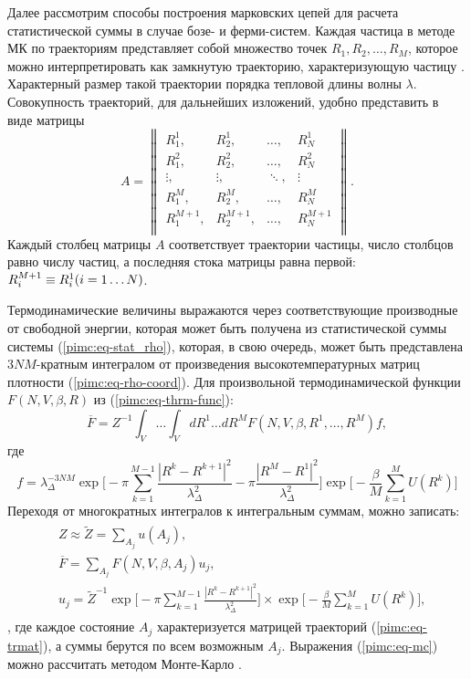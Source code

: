 Далее рассмотрим способы построения марковских цепей для расчета статистической суммы в случае бозе- и ферми-систем.
Каждая частица в методе МК по траекториям представляет собой множество точек ${R_1,R_2,\dots,R_M}$, которое можно интерпретировать как замкнутую траекторию, характеризующую частицу \cite{feiman2013}.
Характерный размер такой траектории порядка тепловой длины волны $\lambda$. Совокупность траекторий, для дальнейших изложений, удобно представить в виде матрицы
\begin{equation}
	\label{pimc:eq-trmat}
	A=
	\begin{Vmatrix}
		R_1^1, &R_2^1, &\dots, &R_N^1\\
		R_1^2, &R_2^2, &\dots, &R_N^2\\
		\vdots, &\vdots, &\ddots, &\vdots \\
		R_1^M, &R_2^M, &\dots, &R_N^M\\
		R_1^{M+1}, &R_2^{M+1}, &\dots, &R_N^{M+1}\\
	\end{Vmatrix}.
\end{equation} 
Каждый столбец матрицы $A$ соответствует траектории частицы, число столбцов равно числу частиц, а последняя стока матрицы равна первой: $R_i^{M+1} \equiv R_i^1 \space (i=1\dots N)$.

Термодинамические величины выражаются через соответствующие производные от свободной энергии, которая может быть получена из статистической суммы системы (\ref{pimc:eq-stat_rho}), которая, в свою очередь, может быть представлена $3NM$-кратным интегралом от произведения высокотемпературных матриц плотности (\ref{pimc:eq-rho-coord}).  Для произвольной термодинамической функции $F(N, V, \beta, R)$ из (\ref{pimc:eq-thrm-func}):
\begin{equation}
	\label{pimc:eq-mean-term}
	\overline{F}=Z^{-1}\int_V\dots \int_V dR^1 \dots dR^M F(N,V,\beta, R^1, \dots, R^M)f,
\end{equation}
где 
\begin{equation*}
	f=\lambda_\Delta^{-3NM} \exp \Big[ -\pi \sum_{k=1}^{M-1} \frac{|R^k -R^{k+1}|^2}{\lambda^2_\Delta} -\pi \frac{|R^M - R^1|^2}{\lambda^2_\Delta} \Big] \exp\Big[-\frac{\beta}{M} \sum_{k=1}^{M} U(R^k) \Big]
\end{equation*}
Переходя от многократных интегралов к интегральным суммам, можно записать:
\begin{eqnarray}
	\label{pimc:eq-mc}
	\begin{aligned}
		& Z\approx\tilde{Z} =\sum_{A_j}u(A_j), \\
		& \overline{F} = \sum_{A_j} F(N,V, \beta, A_j)u_j, \\
		& u_j =\tilde{Z}^{-1} \exp \Big[ -\pi \sum_{k=1}^{M-1} \frac{|R^k -R^{k+1}|^2}{\lambda^2_\Delta} \Big] \times 
										 \exp\Big[-\frac{\beta}{M} \sum_{k=1}^{M} U(R^k) \Big], 							 
	\end{aligned}
\end{eqnarray},
где каждое состояние $A_j$ характеризуется матрицей траекторий (\ref{pimc:eq-trmat}), а суммы берутся по всем возможным $A_j$. Выражения (\ref{pimc:eq-mc}) можно рассчитать методом Монте-Карло \cite{zamalin1973, fillinov1973}.

